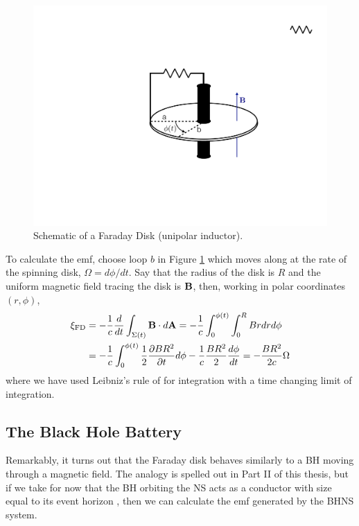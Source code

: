 \begin{figure}
\begin{center}
\includegraphics[scale=0.33]{figures/ch0/UI_schematic} 
\end{center}
\caption{Schematic of a Faraday Disk (unipolar inductor).}
\label{Fig:FDschem}
\end{figure}


To calculate the emf, choose loop $b$ in Figure \ref{Fig:FDschem} which moves
along at the rate of the spinning disk, $\Omega = d\phi/dt$. Say that the
radius of the disk is $R$ and the uniform magnetic field tracing the disk is ${\bf B}$, then, working in polar coordinates $(r, \phi)$,
\begin{align}
\xi_{\rm FD} &= - \frac{1}{c} \frac{d}{dt} \int_{\Sigma(t)}{{\bf B} \cdot d{\bf A}} =  - \frac{1}{c} \int^{\phi(t)}_{0} \int^{R}_{0}{B r dr d\phi}  \\
&= - \frac{1}{c} \int^{\phi(t)}_{0}{\frac{1}{2}\frac{\partial B R^2}{\partial t} d\phi} -  \frac{1}{c} \frac{B R^2}{2} \frac{d\phi}{dt}  = -\frac{B R^2}{2c} \Omega
\end{align}
where we have used Leibniz's rule of for integration with a time changing limit of integration. 

\subsection{The Black Hole Battery} 
Remarkably, it turns out that the Faraday
disk behaves similarly to a BH moving through a magnetic field. The analogy is
spelled out in Part II of this thesis, but if we take for now that the BH
orbiting the NS acts as a conductor with size equal to its event horizon
\citep{MPBook}, then we can calculate the emf generated by the BHNS system.

